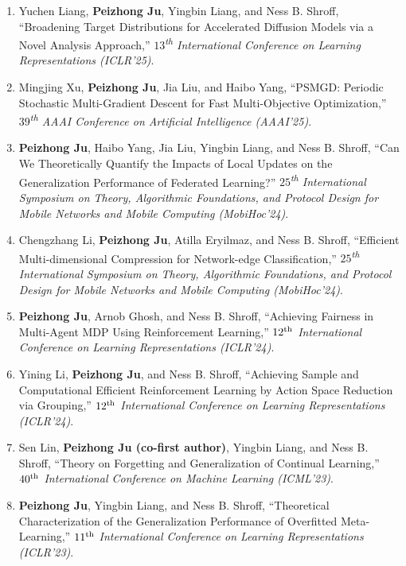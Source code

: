 \documentclass[10pt,letter]{article}
\begin{document}
\begin{small}
\begin{enumerate}
    \item Yuchen Liang, \textbf{Peizhong Ju}, Yingbin Liang, and Ness B. Shroff, ``Broadening Target Distributions for Accelerated Diffusion Models via a Novel Analysis Approach,'' \textit{$13$\textsuperscript{th} International Conference on Learning Representations (ICLR'25)}.

    \item Mingjing Xu, \textbf{Peizhong Ju}, Jia Liu, and Haibo Yang, ``PSMGD: Periodic Stochastic Multi-Gradient Descent for Fast Multi-Objective Optimization,'' \textit{$39$\textsuperscript{th} AAAI Conference on Artificial Intelligence (AAAI'25)}.

    \item \textbf{Peizhong Ju}, Haibo Yang, Jia Liu, Yingbin Liang, and Ness B. Shroff, ``Can We Theoretically Quantify the Impacts of Local Updates on the Generalization Performance of Federated Learning?'' \textit{$25$\textsuperscript{th} International Symposium on Theory, Algorithmic Foundations, and Protocol Design for Mobile Networks and Mobile Computing (MobiHoc'24)}.

    \item Chengzhang Li, \textbf{Peizhong Ju}, Atilla Eryilmaz, and Ness B. Shroff, ``Efficient Multi-dimensional Compression for Network-edge Classification,'' \textit{$25$\textsuperscript{th} International Symposium on Theory, Algorithmic Foundations, and Protocol Design for Mobile Networks and Mobile Computing (MobiHoc'24)}.

    \item \textbf{Peizhong Ju}, Arnob Ghosh, and Ness B. Shroff, ``Achieving Fairness in Multi-Agent MDP Using Reinforcement Learning,'' \textit{$12\textsuperscript{th}$ International Conference on Learning Representations (ICLR'24)}.

    \item Yining Li, \textbf{Peizhong Ju}, and Ness B. Shroff, ``Achieving Sample and Computational Efficient Reinforcement Learning by Action Space Reduction via Grouping,'' \textit{$12\textsuperscript{th}$ International Conference on Learning Representations (ICLR'24)}.

    \item Sen Lin, \textbf{Peizhong Ju (co-first author)}, Yingbin Liang, and Ness B. Shroff, ``Theory on Forgetting and Generalization of Continual Learning,''  \emph{$40\textsuperscript{th}$ International Conference on Machine Learning (ICML'23)}.
    
    \item \textbf{Peizhong Ju}, Yingbin Liang, and Ness B. Shroff, ``Theoretical Characterization of the Generalization Performance of Overfitted Meta-Learning,'' \emph{$11\textsuperscript{th}$ International Conference on Learning Representations (ICLR'23)}.


\end{enumerate}
\end{small}
\end{document}
